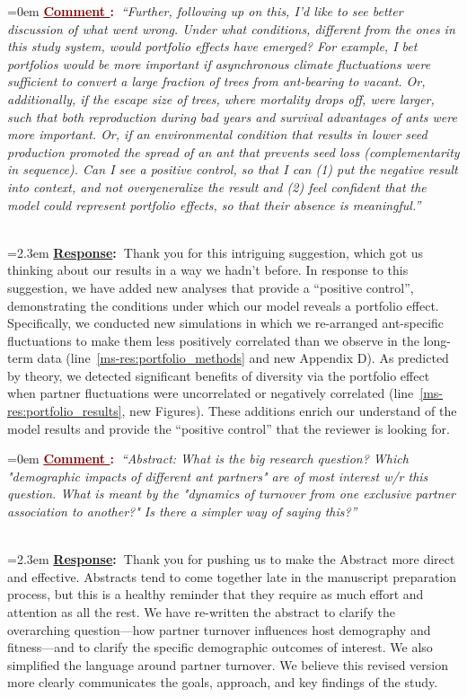 \documentclass[12pt]{article}
\newcounter{cN}
\newcommand{\comment}[1]{
	\vspace{2em}
	\refstepcounter{cN} %
	\noindent \hangindent=0em \textbf{\textcolor{Maroon}{\uline{Comment \thecN}:~}}\emph{``#1''}
	}
\newcommand{\response}[1]{
	\\[0.25em]
	\hangindent=2.3em \textbf{\textcolor{NavyBlue}{\uline{Response}:~}}#1
	}
\begin{document}
\comment{Further, following up on this, I'd like to see better discussion of what went wrong. 
Under what conditions, different from the ones in this study system, would portfolio effects have emerged? 
For example, I bet portfolios would be more important if asynchronous climate fluctuations were sufficient to convert a large fraction of trees from ant-bearing to vacant. 
Or, additionally, if the escape size of trees, where mortality drops off, were larger, such that both reproduction during bad years and survival advantages of ants were more important.  
Or, if an environmental condition that results in lower seed production promoted the spread of an ant that prevents seed loss (complementarity in sequence).
Can I see a positive control, so that I can (1) put the negative result into context, and not overgeneralize the result and (2) feel confident that the model could represent portfolio effects, so that their absence is meaningful.}
\response{Thank you for this intriguing suggestion, which got us thinking about our results in a way we hadn't before. 
In response to this suggestion, we have added new analyses that provide a ``positive control'', demonstrating the conditions under which our model reveals a portfolio effect.
Specifically, we conducted new simulations in which we re-arranged ant-specific fluctuations to make them less positively correlated than we observe in the long-term data (line~\ref{ms-res:portfolio_methods} and new Appendix D).
As predicted by theory, we detected significant benefits of diversity via the portfolio effect when partner fluctuations were uncorrelated or negatively correlated (line~\ref{ms-res:portfolio_results}, new Figures). 
These additions enrich our understand of the model results and provide the ``positive control'' that the reviewer is looking for.}

\comment{Abstract: What is the big research question? 
Which "demographic impacts of different ant partners" are of most interest w/r this question. 
What is meant by the "dynamics of turnover from one exclusive partner association to another?" Is there a simpler way of saying this?}
\response{Thank you for pushing us to make the Abstract more direct and effective. 
Abstracts tend to come together late in the manuscript preparation process, but this is a healthy reminder that they require as much effort and attention as all the rest. 
We have re-written the abstract to clarify the overarching question—how partner turnover influences host demography and fitness—and to clarify the specific demographic outcomes of interest. 
We also simplified the language around partner turnover.
We believe this revised version more clearly communicates the goals, approach, and key findings of the study.}
\end{document}
